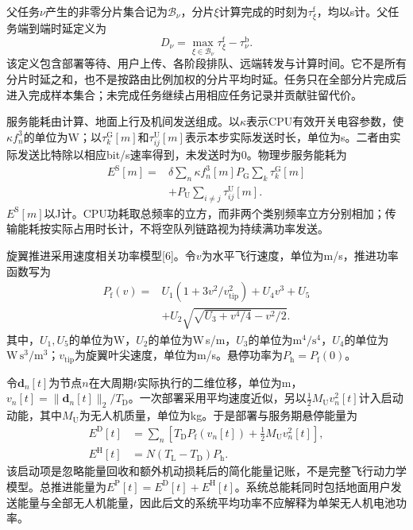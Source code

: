 父任务$\nu$产生的非零分片集合记为$\mathcal B_\nu$，分片$\xi$计算完成的时刻为$\tau_\xi^{\mathrm f}$，均以s计。父任务端到端时延定义为
\[
D_\nu=\max_{\xi\in\mathcal B_\nu}\tau_\xi^{\mathrm f}
 -\tau_\nu^{\mathrm b}.\tag{17}
\]
该定义包含部署等待、用户上传、各阶段排队、远端转发与计算时间。它不是所有分片时延之和，也不是按路由比例加权的分片平均时延。任务只在全部分片完成后进入完成样本集合；未完成任务继续占用相应任务记录并贡献驻留代价。

服务能耗由计算、地面上行及机间发送组成。以$\kappa$表示CPU有效开关电容参数，使$\kappa f_n^3$的单位为W；以$\tau_k^{\mathrm G}[m]$和$\tau_{ij}^{\mathrm U}[m]$表示本步实际发送时长，单位为s。二者由实际发送比特除以相应bit/s速率得到，未发送时为0。物理步服务能耗为
\[
\begin{aligned}
 E^{\mathrm S}[m]={}&
 \delta\sum_n\kappa f_n^3[m]
 P_{\mathrm G}\sum_k\tau_k^{\mathrm G}[m]\\
 &+P_{\mathrm U}\sum_{i\ne j}\tau_{ij}^{\mathrm U}[m].
 \end{aligned}\tag{18}
\]
$E^{\mathrm S}[m]$以J计。CPU功耗取总频率的立方，而非两个类别频率立方分别相加；传输能耗按实际占用时长计，不将空队列链路视为持续满功率发送。

旋翼推进采用速度相关功率模型[6]。令$v$为水平飞行速度，单位为m/s，推进功率函数写为
\[
\begin{aligned}
 P_{\mathrm f}(v)={}&U_1(1+3v^2/v_{\mathrm{tip}}^2)+U_4v^3+U_5\\
 &+U_2\sqrt{\sqrt{U_3+v^4/4}-v^2/2}.
 \end{aligned}\tag{19}
\]
其中，$U_1,U_5$的单位为W，$U_2$的单位为W\,s/m，$U_3$的单位为$\mathrm{m^4/s^4}$，$U_4$的单位为$\mathrm{W\,s^3/m^3}$；$v_{\mathrm{tip}}$为旋翼叶尖速度，单位为m/s。悬停功率为$P_{\mathrm h}=P_{\mathrm f}(0)$。

令$\boldsymbol d_n[t]$为节点$n$在大周期$t$实际执行的二维位移，单位为m，$v_n[t]=\|\boldsymbol d_n[t]\|_2/T_{\mathrm D}$。一次部署采用平均速度近似，另以$\frac12M_{\mathrm U}v_n^2[t]$计入启动动能，其中$M_{\mathrm U}$为无人机质量，单位为kg。于是部署与服务期悬停能量为
\[
\begin{aligned}
 E^{\mathrm D}[t]&=\sum_n\left[T_{\mathrm D}P_{\mathrm f}(v_n[t])
 +\tfrac12M_{\mathrm U}v_n^2[t]\right],\\
 E^{\mathrm H}[t]&=N(T_{\mathrm L}-T_{\mathrm D})P_{\mathrm h}.
 \end{aligned}\tag{20}
\]
该启动项是忽略能量回收和额外机动损耗后的简化能量记账，不是完整飞行动力学模型。总推进能量为$E^{\mathrm P}[t]=E^{\mathrm D}[t]+E^{\mathrm H}[t]$。系统总能耗同时包括地面用户发送能量与全部无人机能量，因此后文的系统平均功率不应解释为单架无人机电池功率。


